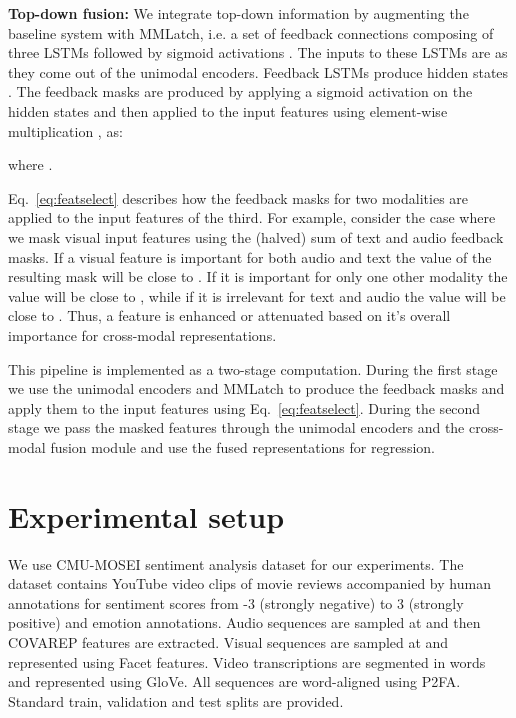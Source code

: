 \documentclass{article}
\begin{document}
\noindent\textbf{Top-down fusion:} 
We integrate top-down information by augmenting the baseline system with MMLatch, i.e. a set of feedback connections composing of three LSTMs followed by sigmoid activations .
The inputs to these LSTMs are  as they come out of the unimodal encoders. Feedback LSTMs produce hidden states .
The feedback masks  are produced by applying a sigmoid activation on the hidden states  and then applied to the input features  using element-wise multiplication , as:







where .




 Eq.~\eqref{eq:featselect} describes how the feedback masks for two modalities are applied to the input features of the third.
For example, consider the case where we mask visual input features using the (halved) sum of text and audio feedback masks.
If a visual feature is important for both audio and text the value of the resulting mask will be close to . If it is important for only one other modality the value will be close to , while if it is irrelevant for text and audio the value will be close to .
Thus, a feature is enhanced or attenuated based on it's overall importance for cross-modal representations.

This pipeline is implemented as a two-stage  computation.
During the first stage we use the unimodal encoders and MMLatch to produce the feedback masks  and apply them to the input features using Eq.~\eqref{eq:featselect}.
During the second stage we pass the masked features  through the unimodal encoders and the cross-modal fusion module and use the fused representations for regression.















\section{Experimental setup}
\label{sec:setup}
We use CMU-MOSEI sentiment analysis dataset \cite{bagher-zadeh-etal-2018-multimodal} for our experiments.
The dataset contains  YouTube video clips of movie reviews accompanied by human annotations for sentiment scores from -3 (strongly negative) to 3 (strongly positive) and emotion annotations.
Audio sequences are sampled at  and then  COVAREP features 
are extracted.
Visual sequences are sampled at  and represented using Facet 
features.
Video transcriptions are segmented in words and  represented using GloVe. All sequences are word-aligned using P2FA. Standard train, validation and test splits are provided.
\end{document}
